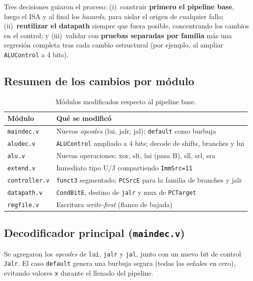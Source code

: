 \documentclass[11pt,a4paper]{article}
\begin{document}
Tres decisiones guiaron el proceso: (i)~construir \textbf{primero el pipeline base},
luego el ISA y al final los \textit{hazards}, para aislar el origen de cualquier fallo;
(ii)~\textbf{reutilizar el datapath} siempre que fuera posible, concentrando los cambios
en el control; y (iii)~validar con \textbf{pruebas separadas por familia} más una
regresión completa tras cada cambio estructural (por ejemplo, al ampliar
\texttt{ALUControl} a 4 bits).

\subsection{Resumen de los cambios por módulo}

\begin{table}[ht]
	\centering
	\begin{tabular}{@{}ll@{}}
		\toprule
		\textbf{Módulo}       & \textbf{Qué se modificó}                                                       \\
		\midrule
		\texttt{maindec.v}    & Nuevos \textit{opcodes} (lui, jalr, jal); \texttt{default} como burbuja        \\
		\texttt{aludec.v}     & \texttt{ALUControl} ampliado a 4 bits; decode de shifts, branches y lui        \\
		\texttt{alu.v}        & Nuevas operaciones: xor, slt, lui (pasa B), sll, srl, sra                      \\
		\texttt{extend.v}     & Inmediato tipo U/J compartiendo \texttt{ImmSrc=11}                             \\
		\texttt{controller.v} & \texttt{funct3} segmentado; \texttt{PCSrcE} para la familia de branches y jalr \\
		\texttt{datapath.v}   & \texttt{CondBitE}, destino de \texttt{jalr} y mux de \texttt{PCTarget}         \\
		\texttt{regfile.v}    & Escritura \textit{write-first} (flanco de bajada)                              \\
		\bottomrule
	\end{tabular}
	\caption{Módulos modificados respecto al pipeline base.}
\end{table}

\subsection{Decodificador principal (\texttt{maindec.v})}

Se agregaron los \textit{opcodes} de \texttt{lui}, \texttt{jalr} y \texttt{jal}, junto
con un nuevo bit de control \texttt{Jalr}. El caso \texttt{default} genera una burbuja
segura (todas las señales en cero), evitando valores \texttt{x} durante el llenado del
pipeline.
\end{document}

